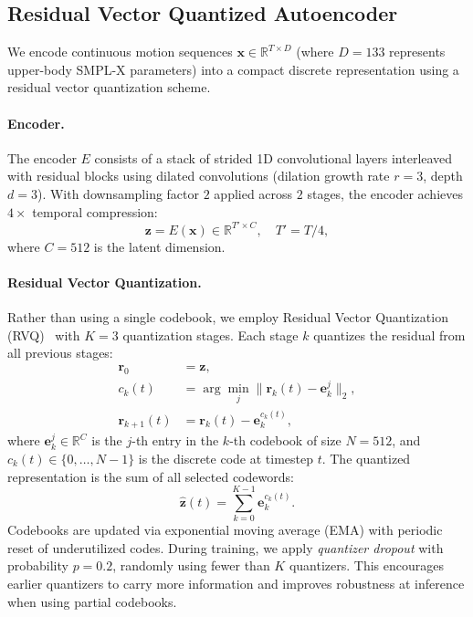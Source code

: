 \documentclass[10pt,twocolumn]{article}
\begin{document}
\subsection{Residual Vector Quantized Autoencoder}

We encode continuous motion sequences $\mathbf{x} \in \mathbb{R}^{T \times D}$ (where $D{=}133$ represents upper-body SMPL-X parameters) into a compact discrete representation using a residual vector quantization scheme.

\paragraph{Encoder.} The encoder $E$ consists of a stack of strided 1D convolutional layers interleaved with residual blocks using dilated convolutions (dilation growth rate $r{=}3$, depth $d{=}3$). With downsampling factor $2$ applied across $2$ stages, the encoder achieves $4\times$ temporal compression:
\begin{equation}
    \mathbf{z} = E(\mathbf{x}) \in \mathbb{R}^{T' \times C}, \quad T' = T/4,
\end{equation}
where $C{=}512$ is the latent dimension.

\paragraph{Residual Vector Quantization.} Rather than using a single codebook, we employ Residual Vector Quantization (RVQ)~\cite{soundstream} with $K{=}3$ quantization stages. Each stage $k$ quantizes the residual from all previous stages:
\begin{align}
    \mathbf{r}_0 &= \mathbf{z}, \\
    c_k(t) &= \arg\min_{j} \| \mathbf{r}_k(t) - \mathbf{e}_k^j \|_2, \\
    \mathbf{r}_{k+1}(t) &= \mathbf{r}_k(t) - \mathbf{e}_k^{c_k(t)},
\end{align}
where $\mathbf{e}_k^j \in \mathbb{R}^{C}$ is the $j$-th entry in the $k$-th codebook of size $N{=}512$, and $c_k(t) \in \{0, \ldots, N{-}1\}$ is the discrete code at timestep $t$. The quantized representation is the sum of all selected codewords:
\begin{equation}
    \hat{\mathbf{z}}(t) = \sum_{k=0}^{K-1} \mathbf{e}_k^{c_k(t)}.
\end{equation}
Codebooks are updated via exponential moving average (EMA) with periodic reset of underutilized codes. During training, we apply \emph{quantizer dropout} with probability $p{=}0.2$, randomly using fewer than $K$ quantizers. This encourages earlier quantizers to carry more information and improves robustness at inference when using partial codebooks.
\end{document}
